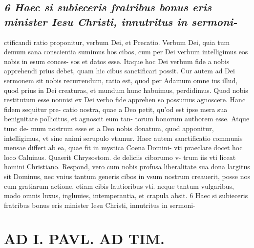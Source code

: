\documentclass{article}
\begin{document}
\begin{pages}
\subsection*{\textit{6 Haec si subieceris fratribus bonus eris minister Iesu Christi, innutritus in sermoni-}}ctificandi ratio proponitur, verbum Dei, et Precatio. Verbum Dei, quia tum demum sana conscientia sumimus hos cibos, cum per Dei verbum intelligimus eos nobis in esum conces- sos et datos esse. Itaque hoc Dei verbum fide a nobis apprehendi prius debet, quam hic cibus sanctificari possit. Cur autem ad Dei sermonem sit nobis recurrendum, ratio est, quod per Adamum omne ius illud, quod prius in Dei creaturas, et mundum hunc habuimus, perdidimus. Quod nobis restitutum esse nonnisi ex Dei verbo fide apprehen so possumus agnoscere. Hanc fidem sequitur pre- catio nostra, quae a Deo petit, qu'od est ipse mera sua benignitate pollicitus, et agnoscit eum tan- torum bonorum authorem esse. Atque tunc de- mum nostrum esse et a Deo nobis donatum, quod apponitur, intelligimus, vt sine animi serupulo vtamur. Haec autem sanctificatio communis mensae differt ab ea, quae fit in mystica Coena Domini- vti praeclare docet hoc loco Caluinus. Quaerit Chrysostom. de deliciis ciborumo v- trum iis vti liceat homini Christiano. Respond, vero cum nobis profusa liberalitate sua dona largitus sit Dominus, nec vnius tantum generis cibos in vsum nostrum creauerit, posse nos cum gratiarum actione, etiam cibis lautioribus vti. neque tantum vulgaribus, modo omnis luxus, ingluuies, intemperantia, et crapula absit. 6 Haec si subieceris fratribus bonus eris minister Iesu Christi, innutritus in sermoni-  \pend
\section*{AD I. PAVL. AD TIM. }
\marginpar{[ p.200 ]}\pstart {}
{}

\end{pages}
\end{document}
